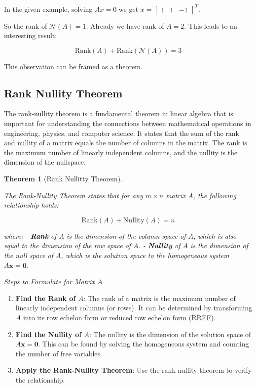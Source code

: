 \documentclass[
  letterpaper,
  DIV=11,
  numbers=noendperiod]{scrreprt}
\theoremstyle{plain}
\newtheorem{theorem}{Theorem}[chapter]
\theoremstyle{definition}
\theoremstyle{remark}
\begin{document}
In the given example, solving \(Ax=0\) we get
\(x=\begin{bmatrix}1&1&-1\end{bmatrix}^T\).

So the rank of \(\mathcal{N}(A)=1\). Already we have rank of \(A=2\).
This leads to an interesting result:

\[\text{Rank}(A)+\text{Rank}(\mathcal{N}(A))=3\]

This observation can be framed as a theorem.

\subsection{Rank Nullity Theorem}\label{rank-nullity-theorem}

The rank-nullity theorem is a fundamental theorem in linear algebra that
is important for understanding the connections between mathematical
operations in engineering, physics, and computer science. It states that
the sum of the rank and nullity of a matrix equals the number of columns
in the matrix. The rank is the maximum number of linearly independent
columns, and the nullity is the dimension of the nullspace.

\begin{theorem}[Rank Nullitty
Theorem]\protect\hypertarget{thm-RNT}{}\label{thm-RNT}

The Rank-Nullity Theorem states that for any \(m \times n\) matrix
\(A\), the following relationship holds:

\[
\text{Rank}(A) + \text{Nullity}(A) = n
\]

where: - \textbf{Rank} of \(A\) is the dimension of the column space of
\(A\), which is also equal to the dimension of the row space of \(A\). -
\textbf{Nullity} of \(A\) is the dimension of the null space of \(A\),
which is the solution space to the homogeneous system
\(A \mathbf{x} = \mathbf{0}\).

\end{theorem}

\emph{Steps to Formulate for Matrix \(A\)}

\begin{enumerate}
\def\labelenumi{\arabic{enumi}.}
\item
  \textbf{Find the Rank of \(A\)}: The rank of a matrix is the maximum
  number of linearly independent columns (or rows). It can be determined
  by transforming \(A\) into its row echelon form or reduced row echelon
  form (RREF).
\item
  \textbf{Find the Nullity of \(A\)}: The nullity is the dimension of
  the solution space of \(A \mathbf{x} = \mathbf{0}\). This can be found
  by solving the homogeneous system and counting the number of free
  variables.
\item
  \textbf{Apply the Rank-Nullity Theorem}: Use the rank-nullity theorem
  to verify the relationship.
\end{enumerate}
\end{document}

